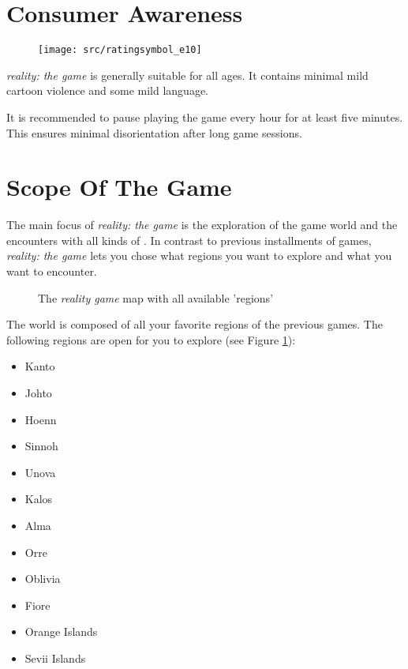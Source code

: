 \section{Consumer Awareness}
\label{software}
\begin{wrapfigure}{R}{60pt}
\vspace{-18pt}
\texttt{[image: src/ratingsymbol\_e10]}
\vspace{-30pt}
\end{wrapfigure}
\emph{\poke{} reality: the game} is generally suitable for all ages. It contains minimal mild cartoon violence and some mild language.

It is recommended to pause playing the game every hour for at least five minutes. This ensures minimal disorientation after long game sessions.

\section{Scope Of The Game}

The main focus of \emph{\poke{} reality: the game} is the exploration of the game world and the encounters with all kinds of \poke{}. In contrast to previous installments of \poke{} games, \emph{\poke{} reality: the game} lets you chose what regions you want to explore and what \poke{} you want to encounter.

\begin{figure}[!ht]
\begin{center}
{%
\setlength{\fboxsep}{2pt}%
\setlength{\fboxrule}{1pt}%
%
}%
\end{center}
\caption[The \emph{\pokeT{} reality game} map with all available 'regions']{The \emph{\poke{} reality game} map with all available 'regions'}
\label{pokemap}
\end{figure}

The \poke{} world is composed of all your favorite regions of the previous games. The following regions are open for you to explore (see Figure \ref{pokemap}):
\begin{multicols}{2}
\begin{itemize}
\item Kanto
\item Johto
\item Hoenn
\item Sinnoh
\item Unova
\item Kalos
\item Alma
\item Orre
\item Oblivia
\item Fiore
\item Orange Islands
\item Sevii Islands
\end{itemize} 
\end{multicols}

